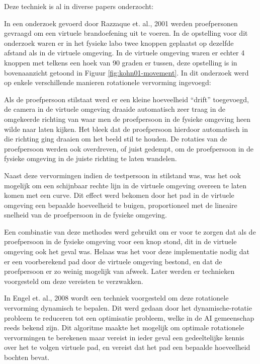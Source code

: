 Deze techniek is al in diverse papers onderzocht:

In een onderzoek gevoerd door Razzaque et. al., 2001 \cite{kohn01} werden 
proefpersonen gevraagd om een virtuele brandoefening uit te voeren. In de 
opstelling voor dit onderzoek waren er in het fysieke labo twee knoppen geplaatst
op dezelfde afstand als in de virtuele omgeving. In de virtuele omgeving waren er
echter 4 knoppen met telkens een hoek van 90 graden er tussen, deze opstelling is
in bovenaanzicht getoond in Figuur \ref{fig:kohn01-movement}. In dit onderzoek
werd op enkele verschillende manieren rotationele vervorming ingevoegd:

Als de proefpersoon stilstaat werd er een kleine hoeveelheid ``drift'' 
toegevoegd, de camera in de virtuele omgeving draaide automatisch zeer traag in 
de omgekeerde richting van waar men de proefpersoon in de fysieke omgeving heen 
wilde naar laten kijken. Het bleek dat de proefpersoon hierdoor automatisch in
die richting ging draaien om het beeld stil te houden. De rotaties van de
proefpersoon werden ook overdreven, of juist gedempt, om de proefpersoon in de
fysieke omgeving in de juiste richting te laten wandelen.

Naast deze vervormingen indien de testpersoon in stilstand was, was het ook
mogelijk om een schijnbaar rechte lijn in de virtuele omgeving overeen te laten
komen met een curve. Dit effect werd bekomen door het pad in de virtuele omgeving
een bepaalde hoeveelheid te buigen, proportioneel met de lineaire snelheid van
de proefpersoon in de fysieke omgeving.

Een combinatie van deze methodes werd gebruikt om er voor te zorgen dat als de
proefpersoon in de fysieke omgeving voor een knop stond, dit in de virtuele
omgeving ook het geval was. Helaas was het voor deze implementatie nodig dat er
een voorberekend pad door de virtuele omgeving bestond, en dat de proefpersoon
er zo weinig mogelijk van afweek. Later werden er technieken voorgesteld om deze
vereisten te verzwakken.

In Engel et. al., 2008 \cite{engel08} wordt een techniek voorgesteld om deze 
rotationele vervorming dynamisch te bepalen. Dit werd gedaan door het 
dynamische-rotatie probleem te reduceren tot een optimisatie probleem, welke in 
de AI gemeenschap reeds bekend zijn. Dit algoritme maakte het mogelijk om 
optimale rotationele vervormingen te berekenen maar vereist in ieder geval een 
gedeeltelijke kennis over het te volgen virtuele pad, en vereist dat het pad een
bepaalde hoeveelheid bochten bevat.

